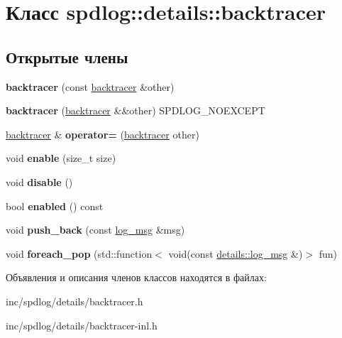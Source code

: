 \hypertarget{classspdlog_1_1details_1_1backtracer}{}\section{Класс spdlog\+:\+:details\+:\+:backtracer}
\label{classspdlog_1_1details_1_1backtracer}
\subsection*{Открытые члены}
\begin{DoxyCompactItemize}
\item 
\mbox{\label{classspdlog_1_1details_1_1backtracer_a3e37c0ea03980c490602bcd2fcc20e01}} 
{\bfseries backtracer} (const \hyperlink{classspdlog_1_1details_1_1backtracer}{backtracer} \&other)
\item 
\mbox{\label{classspdlog_1_1details_1_1backtracer_adfe10df58ca31f02f178e51bed405c64}} 
{\bfseries backtracer} (\hyperlink{classspdlog_1_1details_1_1backtracer}{backtracer} \&\&other) S\+P\+D\+L\+O\+G\+\_\+\+N\+O\+E\+X\+C\+E\+PT
\item 
\mbox{\label{classspdlog_1_1details_1_1backtracer_a49695dceff886eeef9cf4ad179d1a644}} 
\hyperlink{classspdlog_1_1details_1_1backtracer}{backtracer} \& {\bfseries operator=} (\hyperlink{classspdlog_1_1details_1_1backtracer}{backtracer} other)
\item 
\mbox{\label{classspdlog_1_1details_1_1backtracer_a7cb69ae682f696ea13ea771b90fbc579}} 
void {\bfseries enable} (size\+\_\+t size)
\item 
\mbox{\label{classspdlog_1_1details_1_1backtracer_a0e3655183f41ef75b568a6571cc67eb6}} 
void {\bfseries disable} ()
\item 
\mbox{\label{classspdlog_1_1details_1_1backtracer_a78c514131543b5682d0143e93a7365ba}} 
bool {\bfseries enabled} () const
\item 
\mbox{\label{classspdlog_1_1details_1_1backtracer_a1f3b157c3fcd6b013d6d16302b8e1a10}} 
void {\bfseries push\+\_\+back} (const \hyperlink{structspdlog_1_1details_1_1log__msg}{log\+\_\+msg} \&msg)
\item 
\mbox{\label{classspdlog_1_1details_1_1backtracer_aa18d7036db805e0af39a967c7cf2f7c8}} 
void {\bfseries foreach\+\_\+pop} (std\+::function$<$ void(const \hyperlink{structspdlog_1_1details_1_1log__msg}{details\+::log\+\_\+msg} \&)$>$ fun)
\end{DoxyCompactItemize}


Объявления и описания членов классов находятся в файлах\+:\begin{DoxyCompactItemize}
\item 
inc/spdlog/details/backtracer.\+h\item 
inc/spdlog/details/backtracer-\/inl.\+h\end{DoxyCompactItemize}
